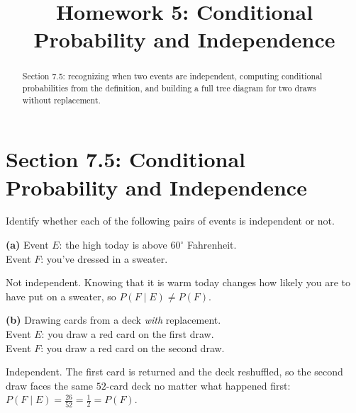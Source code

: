 \documentclass[12pt]{ximera}
\title{Homework 5: Conditional Probability and Independence}
\begin{document}
\begin{abstract}
Section 7.5: recognizing when two events are independent, computing conditional
probabilities from the definition, and building a full tree diagram for two draws
without replacement.
\end{abstract}
\maketitle

\section*{Section 7.5: Conditional Probability and Independence}

\begin{problem}
Identify whether each of the following pairs of events is independent or not.

\begin{prompt}
\textbf{(a)} Event $E$: the high today is above $60^\circ$ Fahrenheit. \\
Event $F$: you've dressed in a sweater.

\begin{multipleChoice}
\end{multipleChoice}

\begin{feedback}
Not independent. Knowing that it is warm today changes how likely you are to have
put on a sweater, so $P(F\mid E)\neq P(F)$.
\end{feedback}
\end{prompt}

\begin{prompt}
\textbf{(b)} Drawing cards from a deck \emph{with} replacement. \\
Event $E$: you draw a red card on the first draw. \\
Event $F$: you draw a red card on the second draw.

\begin{multipleChoice}
\end{multipleChoice}

\begin{feedback}
Independent. The first card is returned and the deck reshuffled, so the second draw
faces the same $52$-card deck no matter what happened first:
$P(F\mid E)=\frac{26}{52}=\frac12=P(F)$.
\end{feedback}
\end{prompt}


\end{problem}
\end{document}

